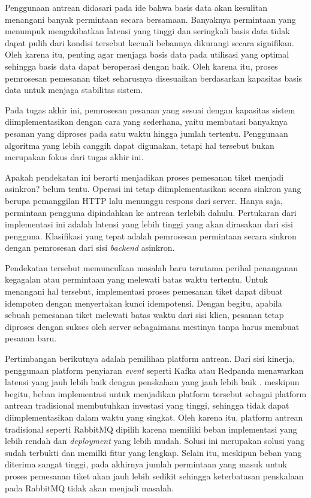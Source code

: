 Penggunaan antrean didasari pada ide bahwa basis data akan kesulitan menangani banyak permintaan secara bersamaan. Banyaknya permintaan yang menumpuk mengakibatkan latensi yang tinggi dan seringkali basis data tidak dapat pulih dari kondisi tersebut kecuali bebannya dikurangi secara signifikan. Oleh karena itu, penting agar menjaga basis data pada utilisasi yang optimal sehingga basis data dapat beroperasi dengan baik. Oleh karena itu, proses pemrosesan pemesanan tiket seharusnya disesuaikan berdasarkan kapasitas basis data untuk menjaga stabilitas sistem.

Pada tugas akhir ini, pemrosesan pesanan yang sesuai dengan kapasitas sistem diimplementasikan dengan cara yang sederhana, yaitu membatasi banyaknya pesanan yang diproses pada satu waktu hingga jumlah tertentu. Penggunaan algoritma yang lebih canggih dapat digunakan, tetapi hal tersebut bukan merupakan fokus dari tugas akhir ini.

Apakah pendekatan ini berarti menjadikan proses pemesanan tiket menjadi asinkron? belum tentu. Operasi ini tetap diimplementasikan secara sinkron yang berupa pemanggilan HTTP lalu menunggu respons dari server. Hanya saja, permintaan pengguna dipindahkan ke antrean terlebih dahulu. Pertukaran dari implementasi ini adalah latensi yang lebih tinggi yang akan dirasakan dari sisi pengguna. Klasifikasi yang tepat adalah pemrosesan permintaan secara sinkron dengan pemrosesan dari sisi \textit{backend} asinkron.

Pendekatan tersebut memunculkan masalah baru terutama perihal penanganan kegagalan atau permintaan yang melewati batas waktu tertentu. Untuk menangani hal tersebut, implementasi proses pemesanan tiket dapat dibuat idempoten dengan menyertakan kunci idempotensi. Dengan begitu, apabila sebuah pemesanan tiket melewati batas waktu dari sisi klien, pesanan tetap diproses dengan sukses oleh server sebagaimana mestinya tanpa harus membuat pesanan baru.

Pertimbangan berikutnya adalah pemilihan platform antrean. Dari sisi kinerja, penggunaan platform penyiaran \textit{event} seperti Kafka atau Redpanda menawarkan latensi yang jauh lebih baik dengan penskalaan yang jauh lebih baik \parencite{comparingKafkaAlternatives}. meskipun begitu, beban implementasi untuk menjadikan platform tersebut sebagai platform antrean tradisional membutuhkan investasi yang tinggi, sehingga tidak dapat diimplementasikan dalam waktu yang singkat. Oleh karena itu, platform antrean tradisional seperti RabbitMQ dipilih karena memiliki beban implementasi yang lebih rendah dan \textit{deployment} yang lebih mudah. Solusi ini merupakan solusi yang sudah terbukti dan memilki fitur yang lengkap. Selain itu, meskipun beban yang diterima sangat tinggi, pada akhirnya jumlah permintaan yang masuk untuk proses pemesanan tiket akan jauh lebih sedikit sehingga keterbatasan penskalaan pada RabbitMQ tidak akan menjadi masalah.
